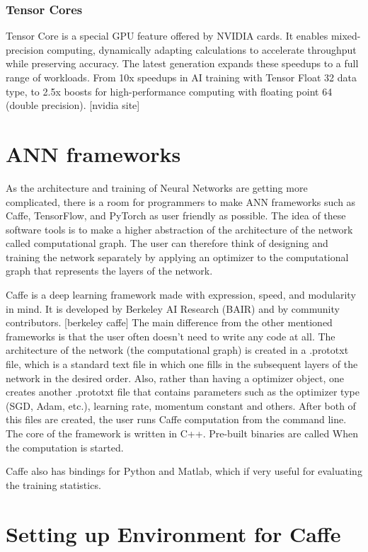 \subsubsection{Tensor Cores}

Tensor Core is a special GPU feature offered by NVIDIA cards. It enables mixed-precision computing, dynamically adapting calculations to accelerate throughput while preserving accuracy. The latest generation expands these speedups to a full range of workloads. From 10x speedups in AI training with Tensor Float 32 data type, to 2.5x boosts for high-performance computing with floating point 64 (double precision). [nvidia site]

\section{ANN frameworks}

As the architecture and training of Neural Networks are getting more complicated, there is a room for programmers to make ANN frameworks such as Caffe, TensorFlow, and PyTorch as user friendly as possible. The idea of these software tools is to make a higher abstraction of the architecture of the network called computational graph. The user can therefore think of designing and training the network separately by applying an optimizer to the computational graph that represents the layers of the network. 

Caffe is a deep learning framework made with expression, speed, and modularity in mind. It is developed by Berkeley AI Research (BAIR) and by community contributors. [berkeley caffe] The main difference from the other mentioned frameworks is that the user often doesn't need to write any code at all. The architecture of the network (the computational graph) is created in a .prototxt file, which is a standard text file in which one fills in the subsequent layers of the network in the desired order. Also, rather than having a optimizer object, one creates another .prototxt file that contains parameters such as the optimizer type (SGD, Adam, etc.), learning rate, momentum constant and others. After both of this files are created, the user runs Caffe computation from the command line. The core of the framework is written in C++. Pre-built binaries are called When the computation is started.

Caffe also has bindings for Python and Matlab, which if very useful for evaluating the training statistics. 

\section{Setting up Environment for Caffe}

